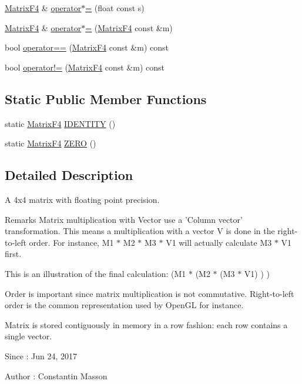 \begin{DoxyCompactItemize}
\item 
\hyperlink{classMatrixF4}{Matrix\-F4} \& \hyperlink{classMatrixF4_adb4f20cad88563060c3efb6326bcbc24}{operator$\ast$=} (float const s)
\item 
\hyperlink{classMatrixF4}{Matrix\-F4} \& \hyperlink{classMatrixF4_a350bb18ec44cab6b2c120beb59044c48}{operator$\ast$=} (\hyperlink{classMatrixF4}{Matrix\-F4} const \&m)
\item 
bool \hyperlink{classMatrixF4_aff7b6b04c09a21aaebd08aaee0df906d}{operator==} (\hyperlink{classMatrixF4}{Matrix\-F4} const \&m) const 
\item 
bool \hyperlink{classMatrixF4_a066a22bcbcc6a78f727f9054b3b8a2f0}{operator!=} (\hyperlink{classMatrixF4}{Matrix\-F4} const \&m) const 
\end{DoxyCompactItemize}
\subsection*{Static Public Member Functions}
\begin{DoxyCompactItemize}
\item 
static \hyperlink{classMatrixF4}{Matrix\-F4} \hyperlink{classMatrixF4_a4ca61fdbc8c1dbec86abd1df07c61aa9}{I\-D\-E\-N\-T\-I\-T\-Y} ()
\item 
static \hyperlink{classMatrixF4}{Matrix\-F4} \hyperlink{classMatrixF4_a1f4bbc3a5a855ac20b66ff6c67bf6543}{Z\-E\-R\-O} ()
\end{DoxyCompactItemize}


\subsection{Detailed Description}
A 4x4 matrix with floating point precision.

\begin{DoxyRemark}{Remarks}
Matrix multiplication with Vector use a 'Column vector' transformation. This means a multiplication with a vector V is done in the right-\/to-\/left order. For instance, M1 $\ast$ M2 $\ast$ M3 $\ast$ V1 will actually calculate M3 $\ast$ V1 first.
\end{DoxyRemark}
This is an illustration of the final calculation\-: (M1 $\ast$ (M2 $\ast$ (M3 $\ast$ V1) ) )

\begin{DoxyParagraph}{}
Order is important since matrix multiplication is not commutative. Right-\/to-\/left order is the common representation used by Open\-G\-L for instance.
\end{DoxyParagraph}
\begin{DoxyParagraph}{}
Matrix is stored contiguously in memory in a row fashion\-: each row contains a single vector.
\end{DoxyParagraph}
\begin{DoxySince}{Since}
\-: Jun 24, 2017 
\end{DoxySince}
\begin{DoxyAuthor}{Author}
\-: Constantin Masson 
\end{DoxyAuthor}


